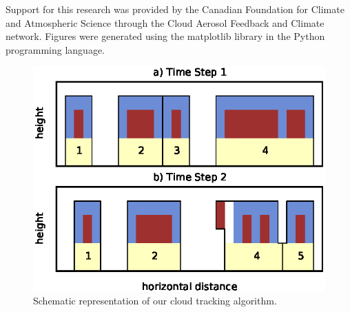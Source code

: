 \documentclass[acp]{copernicus}
\begin{document}
\begin{acknowledgements}
Support for this research was provided by the Canadian Foundation for Climate 
and Atmospheric Science through the Cloud Aerosol Feedback and Climate 
network.  Figures were generated using the matplotlib library in the Python
programming language.
\end{acknowledgements}


















\begin{figure}[t]
\vspace*{2mm}
\begin{center}
\includegraphics[width=12cm]{./figures/cloudfinder_instructions}
\end{center}
\caption{Schematic representation of our cloud tracking algorithm.}
\label{fig:cloudfinder_instructions}
\end{figure}
\end{document}
